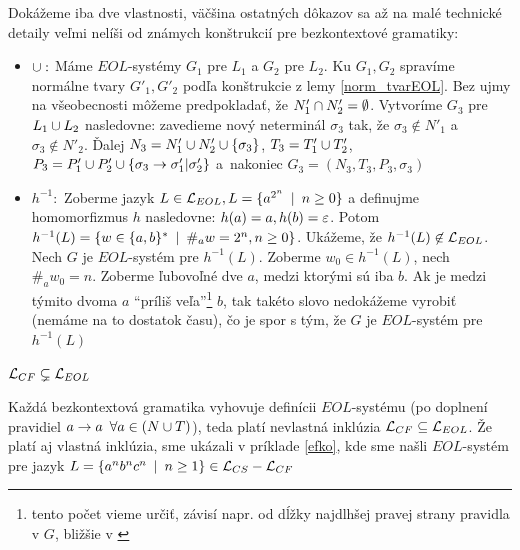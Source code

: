 \begin{dokaz}
  Dokážeme iba dve vlastnosti, väčšina ostatných dôkazov sa až na
  malé technické detaily veľmi nelíši od známych konštrukcií pre
  bezkontextové gramatiky:
  \begin{itemize}
    \item $\cup :$ Máme $EOL$-systémy $G_{1}$ pre $L_{1}$ a $G_{2}$
      pre $L_{2}$. Ku $G_{1},G_{2}$ spravíme normálne tvary
      $G'_{1},G'_{2}$ podľa konštrukcie z lemy \ref{norm_tvarEOL}. Bez
      ujmy na všeobecnosti môžeme predpokladať, že $N'_{1}\cap
      N'_{2}=\emptyset$. Vytvoríme $G_{3}$ pre $L_{1}\cup L_{2}$
      nasledovne: zavedieme nový neterminál $\sigma_{3}$ tak, že
      $\sigma_{3}\not\in N'_{1}$ \mbox{a $\sigma_{3}\not\in N'_{2}$}.
      Ďalej $N_{3}=N'_{1}\cup N'_{2}\cup\{\sigma_{3}\}$,
      $T_{3}=T'_{1}\cup T'_{2}$, $P_{3}=P'_{1}\cup
      P'_{2}\cup\{\sigma_{3}\rightarrow\sigma'_{1}|\sigma'_{2}\}$ \mbox{a
      nakoniec} $G_{3}=(N_{3},T_{3},P_{3},\sigma_{3})$
    \item $h^{-1} :$ Zoberme jazyk $L\in\mathcal{L}_{EOL},
      L=\{a^{2^n}\enspace |\enspace n\geq0\}$ a definujme homomorfizmus $h$ nasledovne:
      $h(a)=a, h(b)=\varepsilon$. Potom $h^{-1}(L)=\{w\in\{a,b\}^*\enspace |\enspace
      \#_a w=2^n,n\geq0\}$. Ukážeme, že
      $h^{-1}(L)\not\in\mathcal{L}_{EOL}$. Nech $G$ je $EOL$-systém pre
      $h^{-1}(L)$. Zoberme $w_0\in h^{-1}(L)$, nech $\#_a w_0=n$.
      Zoberme ľubovoľné dve $a$, medzi ktorými sú iba $b$. Ak je medzi
      týmito dvoma $a$ ``príliš veľa''\footnote{tento počet vieme určiť,
      závisí napr. od dĺžky najdlhšej pravej strany pravidla v $G$,
      bližšie v \cite{clos}} $b$, tak takéto slovo nedokážeme vyrobiť
      (nemáme na to dostatok času), čo je spor s tým, že $G$ je
      $EOL$-systém pre $h^{-1}(L)$
  \end{itemize}
\end{dokaz}

\begin{veta}
  $\mathcal{L}_{CF} \subsetneq \mathcal{L}_{EOL}$
\end{veta}

\begin{dokaz}
  Každá bezkontextová gramatika vyhovuje definícii $EOL$-systému (po
  doplnení pravidiel $a\rightarrow a\enspace\forall a\in(N\cup T)$), teda platí
  nevlastná inklúzia $\mathcal{L}_{CF} \subseteq \mathcal{L}_{EOL}$.
  Že platí aj vlastná inklúzia, sme ukázali v príklade \ref{efko},
  kde sme našli $EOL$-systém pre jazyk $L=\{a^{n}b^{n}c^{n}\enspace |\enspace
  n\geq1\}\in \mathcal{L}_{CS} - \mathcal{L}_{CF}$
\end{dokaz}

